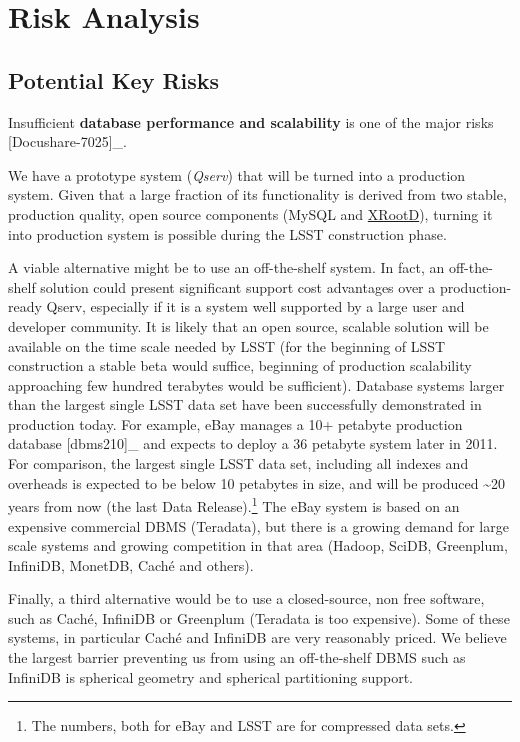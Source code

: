 \documentclass[DM,lsstdraft,toc]{lsstdoc}
\begin{document}
\section{Risk Analysis}\label{risk-analysis}

\subsection{Potential Key Risks}\label{potential-key-risks}

Insufficient \textbf{database performance and scalability} is one of the
major risks {[}Docushare-7025{]}\_.

We have a prototype system (\emph{Qserv}) that will be turned into a
production system. Given that a large fraction of its functionality is
derived from two stable, production quality, open source components
(MySQL and \href{http://xrootd.org}{XRootD}), turning it into production
system is possible during the LSST construction phase.

A viable alternative might be to use an off-the-shelf system. In fact,
an off-the-shelf solution could present significant support cost
advantages over a production-ready Qserv, especially if it is a system
well supported by a large user and developer community. It is likely
that an open source, scalable solution will be available on the time
scale needed by LSST (for the beginning of LSST construction a stable
beta would suffice, beginning of production scalability approaching few
hundred terabytes would be sufficient). Database systems larger than the
largest single LSST data set have been successfully demonstrated in
production today. For example, eBay manages a 10+ petabyte production
database {[}dbms210{]}\_ and expects to deploy a 36 petabyte system
later in 2011. For comparison, the largest single LSST data set,
including all indexes and overheads is expected to be below 10 petabytes
in size, and will be produced \textasciitilde{}20 years from now (the
last Data Release).\footnote{The numbers, both for eBay and LSST are for
  compressed data sets.} The eBay system is based on an expensive
commercial DBMS (Teradata), but there is a growing demand for large
scale systems and growing competition in that area (Hadoop, SciDB,
Greenplum, InfiniDB, MonetDB, Caché and others).

Finally, a third alternative would be to use a closed-source, non free
software, such as Caché, InfiniDB or Greenplum (Teradata is too
expensive). Some of these systems, in particular Caché and InfiniDB are
very reasonably priced. We believe the largest barrier preventing us
from using an off-the-shelf DBMS such as InfiniDB is spherical geometry
and spherical partitioning support.
\end{document}
